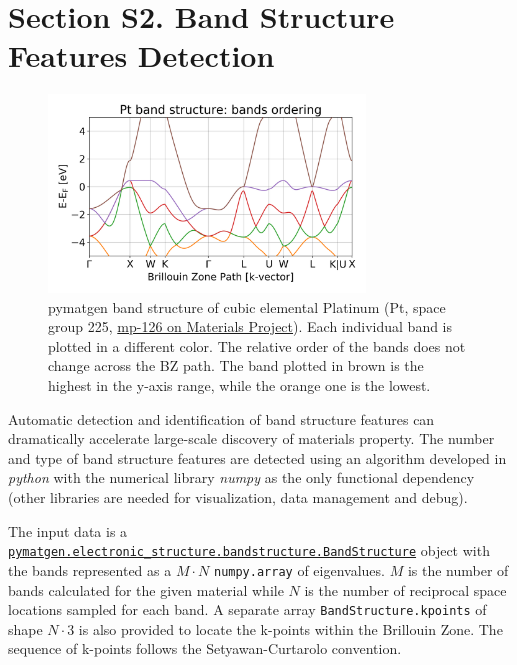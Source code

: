 \documentclass{article}
\begin{document}

\section*{Section S2. Band Structure Features Detection}
\begin{figure}[H]
    \centering
    \includegraphics[width=0.75\textwidth]{figures/mp-126_band-structure_order.png}
    \caption{pymatgen band structure of cubic elemental Platinum (Pt, space group 225, \href{https://materialsproject.org/materials/mp-126/}{mp-126 on Materials Project}). Each individual band is plotted in a different color. The relative order of the bands does not change across the BZ path. The band plotted in brown is the highest in the y-axis range, while the orange one is the lowest.}
    \label{fig:bands_order}
\end{figure}

Automatic detection and identification of band structure features can dramatically accelerate large-scale discovery of materials property. The number and type of band structure features are detected using an algorithm developed in \textit{python} with the numerical library \textit{numpy} as the only functional dependency (other libraries are needed for visualization, data management and debug).

The input data is a \href{https://materialsproject.org/materials/mp-126/}{\texttt{pymatgen.electronic\_structure.bandstructure.BandStructure}} object with the bands represented as a $M \cdot N$ \texttt{numpy.array} of eigenvalues. $M$ is the number of bands calculated for the given material while $N$ is the number of reciprocal space locations sampled for each band. A separate array \texttt{BandStructure.kpoints} of shape $N \cdot 3$ is also provided to locate the k-points within the Brillouin Zone. The sequence of k-points follows the Setyawan-Curtarolo \cite{setyawan2010high} convention.
\end{document}
